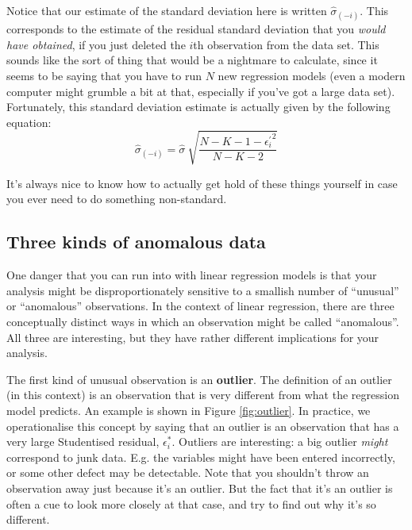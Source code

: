 \documentclass[
  11pt,
  a4paper,
  twoside,symmetric,openright]{book}
\theoremstyle{break}
\theoremstyle{break}
\begin{document}
Notice that our estimate of the standard deviation here is written \(\hat{\sigma}_{(-i)}\). This corresponds to the estimate of the residual standard deviation that you \emph{would have obtained}, if you just deleted the \(i\)th observation from the data set. This sounds like the sort of thing that would be a nightmare to calculate, since it seems to be saying that you have to run \(N\) new regression models (even a modern computer might grumble a bit at that, especially if you've got a large data set). Fortunately, this standard deviation estimate is actually given by the following equation:
\[
\hat\sigma_{(-i)} = \hat{\sigma} \ \sqrt{\frac{N-K-1 - {\epsilon_{i}^\prime}^2}{N-K-2}}
\]

It's always nice to know how to actually get hold of these things yourself in case you ever need to do something non-standard.

\subsection{Three kinds of anomalous data}\label{regressionoutliers}

One danger that you can run into with linear regression models is that your analysis might be disproportionately sensitive to a smallish number of ``unusual'' or ``anomalous'' observations. In the context of linear regression, there are three conceptually distinct ways in which an observation might be called ``anomalous''. All three are interesting, but they have rather different implications for your analysis.

The first kind of unusual observation is an \textbf{outlier}. The definition of an outlier (in this context) is an observation that is very different from what the regression model predicts. An example is shown in Figure \ref{fig:outlier}. In practice, we operationalise this concept by saying that an outlier is an observation that has a very large Studentised residual, \(\epsilon_i^*\). Outliers are interesting: a big outlier \emph{might} correspond to junk data. E.g. the variables might have been entered incorrectly, or some other defect may be detectable. Note that you shouldn't throw an observation away just because it's an outlier. But the fact that it's an outlier is often a cue to look more closely at that case, and try to find out why it's so different.
\end{document}
